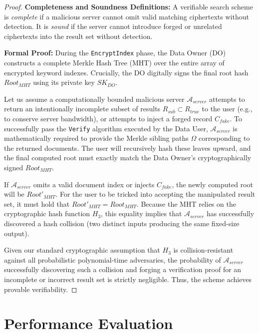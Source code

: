 \documentclass[10pt,journal,compsoc]{IEEEtran}
\begin{document}
\begin{proof}
\textbf{Completeness and Soundness Definitions:} A verifiable search scheme is \textit{complete} if a malicious server cannot omit valid matching ciphertexts without detection. It is \textit{sound} if the server cannot introduce forged or unrelated ciphertexts into the result set without detection.

\textbf{Formal Proof:} During the \texttt{EncryptIndex} phase, the Data Owner (DO) constructs a complete Merkle Hash Tree (MHT) over the entire array of encrypted keyword indexes. Crucially, the DO digitally signs the final root hash $Root_{MHT}$ using its private key $SK_{DO}$. 

Let us assume a computationally bounded malicious server $\mathcal{A}_{server}$ attempts to return an intentionally incomplete subset of results $R_{sub} \subset R_{true}$ to the user (e.g., to conserve server bandwidth), or attempts to inject a forged record $C_{fake}$. To successfully pass the \texttt{Verify} algorithm executed by the Data User, $\mathcal{A}_{server}$ is mathematically required to provide the Merkle sibling paths $\Omega$ corresponding to the returned documents. The user will recursively hash these leaves upward, and the final computed root must exactly match the Data Owner's cryptographically signed $Root_{MHT}$.

If $\mathcal{A}_{server}$ omits a valid document index or injects $C_{fake}$, the newly computed root will be $Root'_{MHT}$. For the user to be tricked into accepting the manipulated result set, it must hold that $Root'_{MHT} = Root_{MHT}$. Because the MHT relies on the cryptographic hash function $H_3$, this equality implies that $\mathcal{A}_{server}$ has successfully discovered a hash collision (two distinct inputs producing the same fixed-size output). 

Given our standard cryptographic assumption that $H_3$ is collision-resistant against all probabilistic polynomial-time adversaries, the probability of $\mathcal{A}_{server}$ successfully discovering such a collision and forging a verification proof for an incomplete or incorrect result set is strictly negligible. Thus, the scheme achieves provable verifiability.
\end{proof}

\section{Performance Evaluation}\label{sec:performance}
\end{document}
